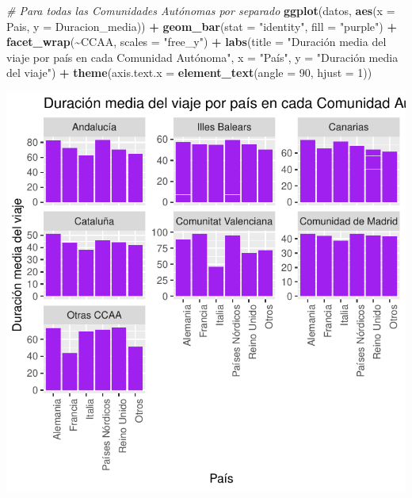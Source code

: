 \documentclass[data,article,submit,moreauthors,pdftex]{Definitions/mdpi}
\newenvironment{Shaded}{\begin{snugshade}}{\end{snugshade}}
\newcommand{\AttributeTok}[1]{\textcolor[rgb]{0.13,0.29,0.53}{#1}}
\newcommand{\CommentTok}[1]{\textcolor[rgb]{0.56,0.35,0.01}{\textit{#1}}}
\newcommand{\DecValTok}[1]{\textcolor[rgb]{0.00,0.00,0.81}{#1}}
\newcommand{\FunctionTok}[1]{\textcolor[rgb]{0.13,0.29,0.53}{\textbf{#1}}}
\newcommand{\NormalTok}[1]{#1}
\newcommand{\SpecialCharTok}[1]{\textcolor[rgb]{0.81,0.36,0.00}{\textbf{#1}}}
\newcommand{\StringTok}[1]{\textcolor[rgb]{0.31,0.60,0.02}{#1}}
\begin{document}
\begin{Shaded}
\begin{Highlighting}[]
\CommentTok{\# Para todas las Comunidades Autónomas por separado}
\FunctionTok{ggplot}\NormalTok{(datos, }\FunctionTok{aes}\NormalTok{(}\AttributeTok{x =}\NormalTok{ Pais, }\AttributeTok{y =}\NormalTok{ Duracion\_media)) }\SpecialCharTok{+} \FunctionTok{geom\_bar}\NormalTok{(}\AttributeTok{stat =} \StringTok{"identity"}\NormalTok{,}
    \AttributeTok{fill =} \StringTok{"purple"}\NormalTok{) }\SpecialCharTok{+} \FunctionTok{facet\_wrap}\NormalTok{(}\SpecialCharTok{\textasciitilde{}}\NormalTok{CCAA, }\AttributeTok{scales =} \StringTok{"free\_y"}\NormalTok{) }\SpecialCharTok{+}
    \FunctionTok{labs}\NormalTok{(}\AttributeTok{title =} \StringTok{"Duración media del viaje por país en cada Comunidad Autónoma"}\NormalTok{,}
        \AttributeTok{x =} \StringTok{"País"}\NormalTok{, }\AttributeTok{y =} \StringTok{"Duración media del viaje"}\NormalTok{) }\SpecialCharTok{+} \FunctionTok{theme}\NormalTok{(}\AttributeTok{axis.text.x =} \FunctionTok{element\_text}\NormalTok{(}\AttributeTok{angle =} \DecValTok{90}\NormalTok{,}
    \AttributeTok{hjust =} \DecValTok{1}\NormalTok{))}
\end{Highlighting}
\end{Shaded}

\includegraphics{ProyectoAED2024_Rmd_files/figure-latex/unnamed-chunk-30-1.pdf}
\end{document}
